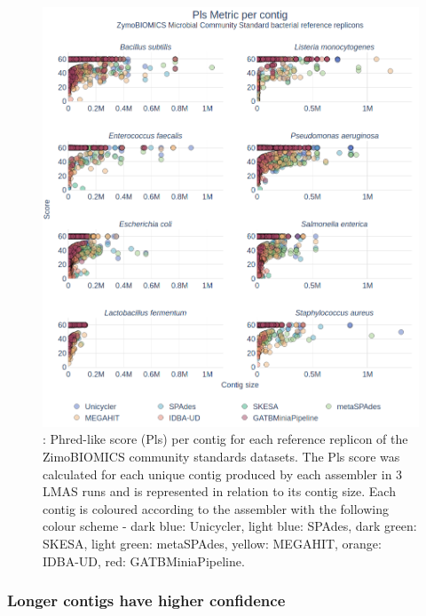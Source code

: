 \begin{figure}[h!]
\centering
\includegraphics[width=\textwidth]{figures/chapter 5/Figure 7.png}
\caption{: Phred-like score (\ac{Pls}) per contig for each reference replicon of the ZimoBIOMICS community standards datasets. The \ac{Pls} score was calculated for each unique contig produced by each assembler in 3 LMAS runs and is represented in relation to its contig size. Each contig is coloured according to the assembler with the following colour scheme - dark blue: Unicycler,  light blue: SPAdes, dark green: SKESA, light green: metaSPAdes, yellow: MEGAHIT, orange: IDBA-UD, red: GATBMiniaPipeline.}
\label{fig:chap5_figure7}
\end{figure}

\subsubsection{Longer contigs have higher confidence}

